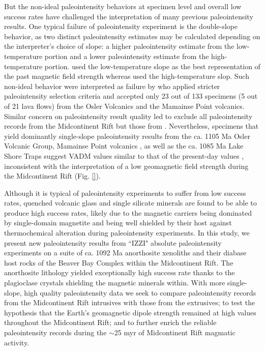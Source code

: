 \documentclass[draft]{agujournal2019}
\begin{document}
But the non-ideal paleointensity behaviors at specimen level and overall low success rates have challenged the interpretation of many previous paleointensity results. One typical failure of paleointensity experiment is the double-slope behavior, as two distinct paleointensity estimates may be calculated depending on the interpreter's choice of slope: a higher paleointensity estimate from the low-temperature portion and a lower paleointensity estimate from the high-temperature portion.  used the low-temperature slope as the best representation of the past magnetic field strength whereas  used the high-temperature slop. Such non-ideal behavior were interpreted as failure by  who applied stricter paleointensity selection criteria and accepted only 23 out of 133 specimens (5 out of 21 lava flows) from the Osler Volcanics and the Mamainse Point volcanics. Similar concern on paleointensity result quality led  to exclude all paleointensity records from the Midcontinent Rift but those from . Nevertheless, specimens that yield dominantly single-slope paleointensity results from the ca. 1105 Ma Osler Volcanic Group, Mamainse Point volcanics \cite{Sprain2018a}, as well as the ca. 1085 Ma Lake Shore Traps \cite{Kulakov2013a} suggest VADM values similar to that of the present-day values \cite{Sprain2018a}, inconsistent with the interpretation of a low geomagnetic field strength during the Midcontinent Rift (Fig. \ref{}). 

Although it is typical of paleointensity experiments to suffer from low success rates, quenched volcanic glass \cite{Tauxe2004a} and single silicate minerals \cite{Tarduno2005a} are found to be able to produce high success rates, likely due to the magnetic carriers being dominated by single-domain magnetite and being well shielded by their host against thermochemical alteration during paleointensity experiments. In this study, we present new paleointensity results from ``IZZI" absolute paleointensity experiments \cite{Yu2004a} on a suite of ca. 1092 Ma anorthosite xenoliths and their diabase host rocks of the Beaver Bay Complex within the Midcontinent Rift. The anorthosite lithology yielded exceptionally high success rate thanks to the plagioclase crystals shielding the magnetic minerals within. With more single-slope, high quality paleointensity data we seek to compare paleointensity records from the Midcontinent Rift intrusives with those from the extrusives; to test the hypothesis that the Earth's geomagnetic dipole strength remained at high values throughout the Midcontinent Rift; and to further enrich the reliable paleointensity records during the $\sim$25 myr of Midcontinent Rift magmatic activity. 
\end{document}
